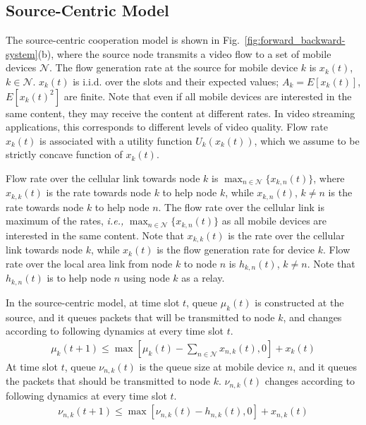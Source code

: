 \documentclass[conference]{IEEEtran}
\newcommand{\ie}{{\em i.e., }}
\newcommand{\Nset}{\mathcal{N}}
\begin{document}
\subsection{Source-Centric Model}
The source-centric cooperation model is shown in Fig.~\ref{fig:forward_backward-system}(b), where the source node transmits a video flow to a set of mobile devices $\Nset$. The flow generation rate at the source for mobile device $k$ is $x_{k}(t)$, $k \in \Nset$. $x_{k}(t)$ is i.i.d. over the slots and their expected values; $A_{k} = E[x_{k}(t)]$, $E[x_{k}(t)^{2}]$ are finite. Note that even if all mobile devices are interested in the same content, they may receive the content at different rates. In video streaming applications, this corresponds to different levels of video quality. Flow rate $x_k(t)$ is associated with a utility function $U_k(x_k(t))$, which we assume to be strictly concave function of $x_k(t)$.

Flow rate over the cellular link towards node $k$ is $\max_{n \in \Nset}\{x_{k,n}(t)\}$, where $x_{k,k}(t)$ is the rate towards node $k$ to help node $k$, while $x_{k,n}(t)$, $k\neq n$ is the rate towards node $k$ to help node $n$. The flow rate over the cellular link is maximum of the rates, \ie $\max_{n \in \Nset}\{x_{k,n}(t)\}$  as all mobile devices are interested in the same content. Note that $x_{k,k}(t)$ is the rate over the cellular link towards node $k$, while $x_k(t)$ is the flow generation rate for device $k$. Flow rate over the local area link from node $k$ to node $n$ is $h_{k,n}(t)$, $k\neq n$. Note that $h_{k,n}(t)$ is to help node $n$ using node $k$ as a relay.

In the source-centric model, at time slot $t$, queue $\mu_{k}(t)$ is constructed at the source, and it queues packets that will be transmitted to node $k$, and changes according to following dynamics at every time slot $t$.
\begin{align} \label{eq:real_queue_evolutionScC1}
\mu_{k}(t+1) \leq \max [\mu_{k}(t) - \sum_{n \in \Nset}{x}_{n,k}(t), 0] + {x}_{k}(t)
\end{align}
At time slot $t$, queue $\nu_{n,k}(t)$ is the queue size at mobile device $n$, and it queues the packets that should be transmitted to node $k$. $\nu_{n,k}(t)$ changes according to following dynamics at every time slot $t$.
\begin{align} \label{eq:real_queue_evolutionScC2}
\nu_{n,k}(t+1) \leq \max [\nu_{n,k}(t) - {h}_{n,k}(t), 0] + {x}_{n,k}(t)
\end{align}
\end{document}
